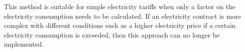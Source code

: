 This method is suitable for simple electricity tariffs when only a factor on the electricity consumption needs to be calculated. If an electricity contract is more complex with different conditions such as a higher electricity price if a certain electricity consumption is exceeded, then this approach can no longer be implemented.

\cleardoublepage

